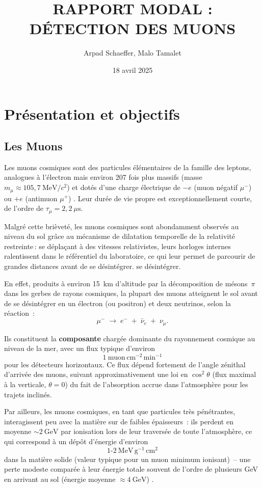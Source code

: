 \documentclass[a4paper,12pt,twoside]{article}
\title{RAPPORT MODAL :\\ DÉTECTION DES MUONS}
\author{Arpad Schaeffer, Malo Tamalet}
\date{18 avril 2025}
\begin{document}
\maketitle

\tableofcontents
\listoffigures
\newpage

\section{Présentation et objectifs}
\subsection{Les Muons}
Les muons cosmiques sont des particules élémentaires de la famille des leptons, analogues à l’électron mais environ 207 fois plus massifs (masse $m_\mu \approx 105{,}7\ \mathrm{MeV}/c^2$) et dotés d’une charge électrique de $-e$ (muon négatif $\mu^-$) ou $+e$ (antimuon $\mu^+$) \cite{wiki:muon,knoll2010}. Leur durée de vie propre est exceptionnellement courte, de l’ordre de $\tau_\mu = 2{,}2\ \mu\mathrm{s}$. 

Malgré cette brièveté, les muons cosmiques sont abondamment observés au niveau du sol grâce au mécanisme de dilatation temporelle de la relativité restreinte\,:
se déplaçant à des vitesses relativistes, leurs horloges internes \og ralentissent\fg{} dans le référentiel du laboratoire, ce qui leur permet de parcourir de grandes distances avant de se désintégrer. se désintégrer.

En effet, produits à environ 15~km d’altitude par la décomposition de mésons~$\pi$ dans les gerbes de rayons cosmiques, la plupart des muons atteignent le sol avant de se désintégrer en un électron (ou positron) et deux neutrinos, selon la réaction :
\[
\mu^- \;\to\; e^- \;+\; \bar{\nu}_e \;+\; \nu_\mu.
\]

Ils constituent la \textbf{composante} chargée dominante du rayonnement cosmique au niveau de la mer, avec un flux typique d’environ 
\[
1\ \text{muon}\,\mathrm{cm^{-2}}\,\mathrm{min^{-1}}
\]
pour les détecteurs horizontaux. Ce flux dépend fortement de l’angle zénithal d’arrivée des muons, suivant approximativement une loi en $\cos^2\theta$ (flux maximal à la verticale, $\theta=0$) du fait de l’absorption accrue dans l’atmosphère pour les trajets inclinés.

Par ailleurs, les muons cosmiques, en tant que particules très pénétrantes, interagissent peu avec la matière sur de faibles épaisseurs : ils perdent en moyenne $\sim2\ \mathrm{GeV}$ par ionisation lors de leur traversée de toute l’atmosphère, ce qui correspond à un dépôt d’énergie d’environ 
\[
1\text{-}2\ \mathrm{MeV}\,\mathrm{g^{-1}}\,\mathrm{cm^2}
\]
dans la matière solide (valeur typique pour un muon minimum ionisant) – une perte modeste comparée à leur énergie totale souvent de l’ordre de plusieurs GeV en arrivant au sol (énergie moyenne $\approx4\ \mathrm{GeV}$) \cite{bethe1930}.
\end{document}
